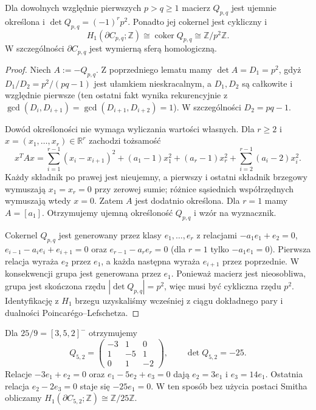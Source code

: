 \begin{twierdzenie}
\label{thm:tg-general-algebra}
Dla dowolnych względnie pierwszych $p>q\geq1$ macierz
$Q_{p,q}$ jest ujemnie określona i
$\det Q_{p,q}=(-1)^r p^2$.
Ponadto jej cokernel jest cykliczny i
\[
H_1(\partial C_{p,q};\mathbb Z)
\cong\operatorname{coker}Q_{p,q}
\cong\mathbb Z/p^2\mathbb Z.
\]
W szczególności $\partial C_{p,q}$ jest wymierną sferą
homologiczną.
\end{twierdzenie}

\begin{proof}
Niech $A:=-Q_{p,q}$. Z poprzedniego lematu mamy
$\det A=D_1=p^2$, gdyż
$D_1/D_2=p^2/(pq-1)$ jest ułamkiem nieskracalnym,
a $D_1,D_2$ są całkowite i względnie pierwsze
(ten ostatni fakt wynika rekurencyjnie z
$\gcd(D_i,D_{i+1})=\gcd(D_{i+1},D_{i+2})=1$).
W szczególności $D_2=pq-1$.

Dowód określoności nie wymaga wyliczania wartości własnych.
Dla $r\geq2$ i $x=(x_1,\ldots,x_r)\in\mathbb R^r$
zachodzi tożsamość
\[
x^TAx=\sum_{i=1}^{r-1}(x_i-x_{i+1})^2
+(a_1-1)x_1^2+(a_r-1)x_r^2
+\sum_{i=2}^{r-1}(a_i-2)x_i^2.
\]
Każdy składnik po prawej jest nieujemny, a pierwszy i ostatni
składnik brzegowy wymuszają $x_1=x_r=0$ przy zerowej sumie;
różnice sąsiednich współrzędnych wymuszają wtedy $x=0$.
Zatem $A$ jest dodatnio określona. Dla $r=1$ mamy $A=[a_1]$.
Otrzymujemy ujemną określoność $Q_{p,q}$ i wzór na wyznacznik.

Cokernel $Q_{p,q}$ jest generowany przez klasy
$e_1,\ldots,e_r$ z relacjami
$-a_1e_1+e_2=0$, $e_{i-1}-a_ie_i+e_{i+1}=0$
oraz $e_{r-1}-a_re_r=0$ (dla $r=1$ tylko
$-a_1e_1=0$). Pierwsza relacja wyraża $e_2$ przez $e_1$,
a każda następna wyraża $e_{i+1}$ przez poprzednie.
W konsekwencji grupa jest generowana przez $e_1$.
Ponieważ macierz jest nieosobliwa, grupa jest skończona rzędu
$|\det Q_{p,q}|=p^2$, więc musi być cykliczna rzędu $p^2$.
Identyfikację z $H_1$ brzegu uzyskaliśmy wcześniej z
ciągu dokładnego pary i dualności Poincarégo--Lefschetza.
\end{proof}

\begin{przyklad}
Dla $25/9=[3,5,2]^-$ otrzymujemy
\[
Q_{5,2}=\begin{pmatrix}-3&1&0\\1&-5&1\\0&1&-2\end{pmatrix},
\qquad\det Q_{5,2}=-25.
\]
Relacje $-3e_1+e_2=0$ oraz
$e_1-5e_2+e_3=0$ dają $e_2=3e_1$ i $e_3=14e_1$.
Ostatnia relacja $e_2-2e_3=0$ staje się
$-25e_1=0$. W ten sposób bez użycia postaci Smitha
obliczamy $H_1(\partial C_{5,2};\mathbb Z)\cong\mathbb Z/25\mathbb Z$.
\end{przyklad}

